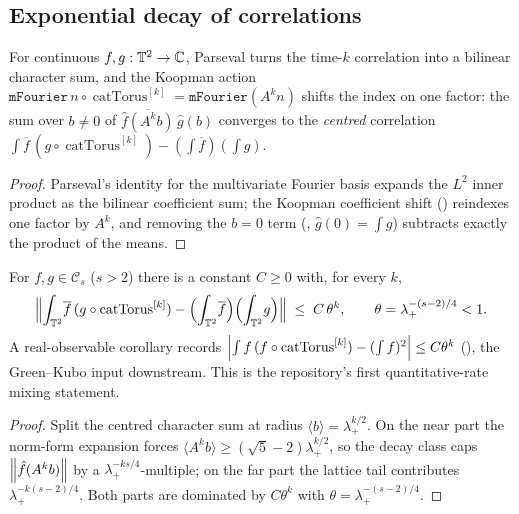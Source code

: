 \subsection{Exponential decay of correlations}

\begin{theorem}\label{hasSum_correlation_fourier_ne_zero}
  \leanok
  For continuous \(f, g:\mathbb{T}^2\to\mathbb{C}\), Parseval turns the time-\(k\) correlation into a bilinear
  character sum, and the Koopman action \(\texttt{mFourier}\,n\circ\operatorname{catTorus}^{[k]} =
  \texttt{mFourier}(A^k n)\) shifts the index on one factor: the sum over \(b\ne 0\) of
  \(\overline{\hat f(A^k b)}\,\hat g(b)\) converges to the \emph{centred} correlation
  \(\int\overline f\,(g\circ\operatorname{catTorus}^{[k]}) - (\int\overline f)(\int g)\).
\end{theorem}
\begin{proof}\leanok
  Parseval's identity for the multivariate Fourier basis expands the \(L^2\) inner product as the
  bilinear coefficient sum; the Koopman coefficient shift
  () reindexes one factor by \(A^k\), and
  removing the \(b = 0\) term (,
  \(\hat g(0) = \int g\)) subtracts exactly the product of the means.
\end{proof}

\begin{theorem}\label{catCorr_decay}
  \leanok
  For \(f, g\in\mathcal C_s\) (\(s > 2\)) there is a constant \(C\ge 0\) with, for every \(k\),
  \[
    \Bigl\lVert \int_{\mathbb{T}^2}\!\overline f\,(g\circ\operatorname{catTorus}^{[k]})
      - \Bigl(\int_{\mathbb{T}^2}\!\overline f\Bigr)\Bigl(\int_{\mathbb{T}^2}\! g\Bigr) \Bigr\rVert
    \;\le\; C\,\theta^{k}, \qquad \theta = \lambda_+^{-(s-2)/4} < 1.
  \]
  A real-observable corollary records \(\left\lvert \int f\,(f\circ\operatorname{catTorus}^{[k]}) -
  (\int f)^2 \right\rvert\le C\theta^{k}\) (), the Green--Kubo
  input downstream. This is the repository's first quantitative-rate mixing statement.
\end{theorem}
\begin{proof}\leanok
  Split the centred character sum  at radius
  \(\langle b\rangle = \lambda_+^{k/2}\). On the near part the norm-form expansion 
  forces \(\langle A^k b\rangle\ge(\sqrt5 - 2)\lambda_+^{k/2}\), so the decay class caps
  \(\left\lVert \hat f(A^k b) \right\rVert\) by a \(\lambda_+^{-ks/4}\)-multiple; on the far part the lattice tail
   contributes \(\lambda_+^{-k(s-2)/4}\). Both parts are dominated by
  \(C\theta^{k}\) with \(\theta = \lambda_+^{-(s-2)/4}\).
\end{proof}

